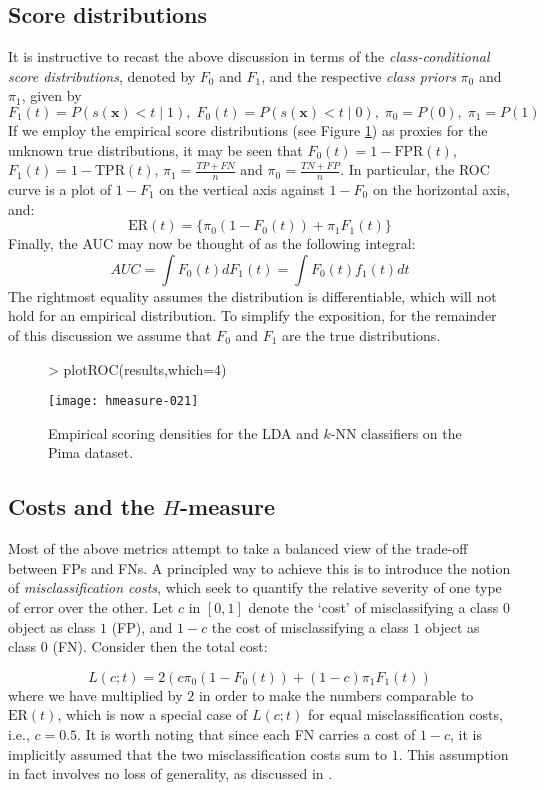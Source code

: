 \documentclass{article}
\begin{document}
\subsection{Score distributions}
It is instructive to recast the above discussion in terms of the \emph{class-conditional score distributions}, denoted by $F_0$ and $F_1$, and the respective \emph{class priors} $\pi_0$ and $\pi_1$, given by
\[
F_1(t) = P(s(\mathbf{x}) < t \mid 1), \; F_0(t) = P(s(\mathbf{x}) < t \mid 0), \; \pi_0 = P(0), \; \pi_1 = P(1)
\]
If we employ the empirical score distributions (see Figure \ref{fig:scores}) as proxies for the unknown true distributions, it may be seen that $F_0(t)=1-\text{FPR}(t)$, $F_1(t)=1-\text{TPR}(t)$, $\pi_1 = \frac{TP+FN}{n}$ and $\pi_0 = \frac{TN+FP}{n}$. In particular, the ROC curve is a plot of $1-F_1$ on the vertical axis against $1-F_0$ on the horizontal axis, and: 
\[
\text{ER}(t) = \{\pi_0(1-F_0(t)) + \pi_1 F_1(t)\}
\]
Finally, the AUC may now be thought of as the following integral:
\[
AUC = \int F_0(t) d F_1(t) = \int F_0(t) f_1(t) dt
\]
The rightmost equality assumes the distribution is differentiable, which will not hold for an empirical distribution. To simplify the exposition, for the remainder of this discussion we assume that $F_0$ and $F_1$ are the true distributions.

\begin{figure}
\begin{Schunk}
\begin{Sinput}
> plotROC(results,which=4)
\end{Sinput}
\end{Schunk}
\texttt{[image: hmeasure-021]}
\caption{\label{fig:scores}Empirical scoring densities for the LDA and $k$-NN classifiers on the Pima dataset.}
\end{figure}
\subsection{Costs and the $H$-measure}\label{sec:costs}
Most of the above metrics attempt to take a balanced view of the trade-off between FPs and FNs. A principled way to achieve this is to introduce the notion of \emph{misclassification costs}, which seek to quantify the relative severity of one type of error over the other. 
Let $c$ in $[0,1]$ denote the `cost' of misclassifying a class $0$ object as class $1$ (FP), and $1-c$ the cost of misclassifying a class $1$ object as class $0$ (FN). Consider then the total cost:

\[
L(c;t) = 2(c\pi_0 (1-F_0(t)) + (1-c)\pi_1 F_1(t))
\]
where we have multiplied by $2$ in order to make the numbers comparable to $\text{ER}(t)$, which is now a special case of $L(c;t)$ for equal misclassification costs, i.e., $c=0.5$. It is worth noting that since each FN carries a cost of $1-c$, it is implicitly assumed that the two misclassification costs sum to $1$. This assumption in fact involves no loss of generality, as discussed in \cite{hand2009}. 
\end{document}
